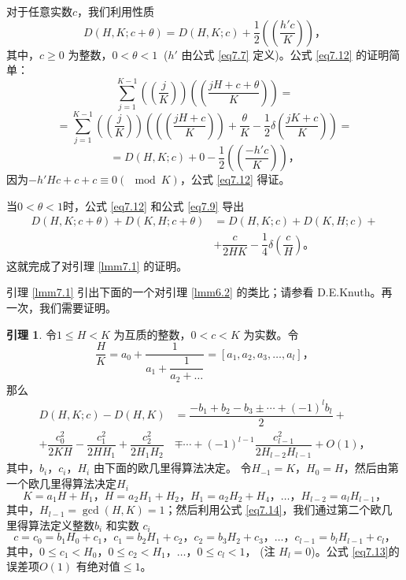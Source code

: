 \documentclass[11pt,a4paper]{article}
\theoremstyle{definition}
\newtheorem{lemma}{\textbf{引理}}[section]
\newcommand{\refeq}[1]{公式 \ref{#1}}
\newcommand{\reflmm}[1]{引理 \ref{#1}}
\numberwithin{equation}{section}
\newcommand{\comma}{\text{，}}
\newcommand{\juhao}{\text{。}}
\newcommand{\mathmod}[3]{ #1\equiv#2\left(\!\!\mod#3\right) }
\newcommand{\dekd}{D\left(H,K\right)}
\newcommand{\myone}[1]{\left(-1\right)^{#1}}
\newcommand{\QEDopen}{{\setlength{\fboxsep}{0pt}\setlength{\fboxrule}{0.2pt}\fbox{\rule[0pt]{0pt}{1.3ex}\rule[0pt]{1.3ex}{0pt}}}}
\newcommand{\ddbrace}[1]{\left(\left(#1\right)\right)}
\newcommand{\glHKdekd}[1]{D\left(H, K; #1\right)}
\newcommand{\glKHdekd}[1]{D\left(K, H; #1\right)}
\begin{document}
对于任意实数$ c $，我们利用性质
\begin{equation}\label{eq7.12}
	\glHKdekd{c+\theta}=\glHKdekd{c}+\dfrac{1}{2}\ddbrace{\dfrac{h'c}{K}}\comma
\end{equation}
其中，$ c\geq 0 $ 为整数，$ 0<\theta<1\: $ ($ h' $ 由\refeq{eq7.7} 定义)。\refeq{eq7.12} 的证明简单：
\[ 	\sum_{j=1}^{K-1}\ddbrace{\dfrac{j}{K}}\ddbrace{\dfrac{jH+c+\theta}{K}}= \]
\[ =\sum_{j=1}^{K-1}\ddbrace{\dfrac{j}{K}}\left(\ddbrace{\dfrac{jH+c}{K}}+\dfrac{\theta}{K}-\dfrac{1}{2}\delta\left(\dfrac{jK+c}{K}\right)\right)= \]
\[ =\glHKdekd{c}+0-\dfrac{1}{2}\ddbrace{\dfrac{-h'c}{K}}\comma \]
因为$\mathmod{-h'Hc+c+c}{0}{K} $，\refeq{eq7.12} 得证。

当$ 0<\theta<1 $时，\refeq{eq7.12} 和\refeq{eq7.9} 导出
\begin{equation*}
\begin{split}
	\glHKdekd{c+\theta}+\glKHdekd{c+\theta}&=\glHKdekd{c}+\glKHdekd{c}+
	\\&+\dfrac{c}{2HK}-\dfrac{1}{4}\delta\left(\dfrac{c}{H}\right)\juhao
	\end{split}
\end{equation*}
这就完成了对\reflmm{lmm7.1} 的证明。\hfill\QEDopen

\reflmm{lmm7.1} 引出下面的一个对\reflmm{lmm6.2} 的类比；请参看 D.E.Knuth\cite{Kn1}。再一次，我们需要证明。
\begin{lemma}\label{lmm7.2}
	令$ 1 \leq H < K $ 为互质的整数，$ 0<c<K $ 为实数。令
\[ 	\dfrac{H}{K}=a_{0}+\dfrac{1}{a_{1}+\dfrac{1}{a_{2}+\ldots}}=\left[a_{1},a_{2},a_{3},\ldots,a_{l}\right]\comma \]
那么
\begin{equation}\label{eq7.13}
	\begin{split}
	\glHKdekd{c}-\dekd&=\dfrac{-b_{1}+b_{2}-b_{3}\pm\cdots+\myone{l}b_{l}}{2}+
	\\+\dfrac{c_{0}^{2}}{2KH}-\dfrac{c_{1}^{2}}{2HH_{1}}+\dfrac{c_{2}^{2}}{2H_{1}H_{2}}&\mp\cdots+\myone{l-1}\dfrac{c_{l-1}^{2}}{2H_{l-2}H_{l-1}}+O(1)\comma
	\end{split}
\end{equation}
其中，$ b_{i}\comma c_{i}\comma H_{i} $ 由下面的欧几里得算法决定。
令$ H_{-1}=K\comma H_{0}=H $，然后由第一个欧几里得算法决定$ H_{i} $
\begin{equation}\label{eq7.14}
K=a_{1}H+H_{1}\comma H=a_{2}H_{1}+H_{2}\comma H_{1}=a_{2}H_{2}+H_{4}\comma\ldots\comma H_{l-2}=a_{l}H_{l-1}\comma
\end{equation}
其中，$ H_{l-1}=\gcd\left(H,K\right)=1 $；然后利用\refeq{eq7.14}，我们通过第二个欧几里得算法定义整数$ b_{i} $ 和实数 $ c_{i} $
\begin{equation}\label{eq7.15}
	c=c_{0}=b_{1}H_{0}+c_{1}\comma c_{1}=b_{2}H_{1}+c_{2}\comma c_{2}=b_{3}H_{2}+c_{3}\comma
	\ldots\comma c_{l-1}=b_{l}H_{l-1}+c_{l}\comma
\end{equation}
其中，$ 0\leq c_{1}<H_{0}\comma 0\leq c_{2}<H_{1}\comma \ldots\comma 0\leq c_{l}<1\comma$ (注 $ H_{l}=0 $)。\refeq{eq7.13}的误差项$ O(1) $ 有绝对值$ \leq1 $。
\end{lemma} 
\end{document}
